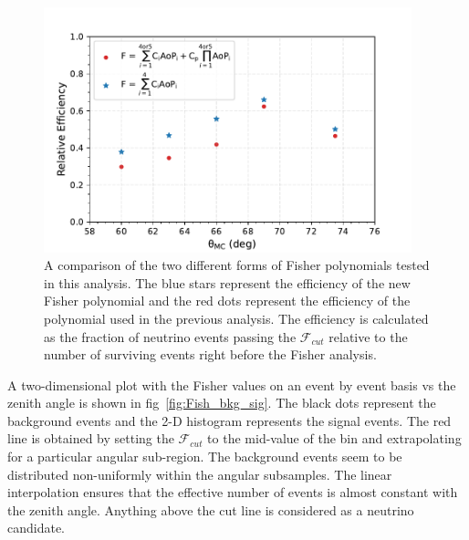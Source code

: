 \begin{figure}[h!]
  \centering
  \includegraphics[width=0.95\textwidth]{thesis_figures/Nu_analysis/Nu_eff/Fisher_efficencies_theta_F_wnt_redcut.pdf}
  \caption{A comparison of the two different forms of Fisher polynomials tested in this analysis. The blue stars represent the efficiency of the new Fisher polynomial and the red dots represent the efficiency of the polynomial used in the previous analysis. The efficiency is calculated as the fraction of neutrino events passing the $\mathcal{F}_{cut}$ relative to the number of surviving events right before the Fisher analysis.}
  \label{fig:Fishpol_v_theta}
\end{figure}

A two-dimensional plot with the Fisher values on an event by event basis vs the zenith angle is shown in fig~\ref{fig:Fish_bkg_sig}. The black dots represent the background events and the 2-D histogram represents the signal events. The red line is obtained by setting the $\mathcal{F}_{cut}$ to the mid-value of the bin and extrapolating for a particular angular sub-region. The background events seem to be distributed non-uniformly within the angular subsamples. The linear interpolation ensures that the effective number of events is almost constant with the zenith angle. Anything above the cut line is considered as a neutrino candidate. 

